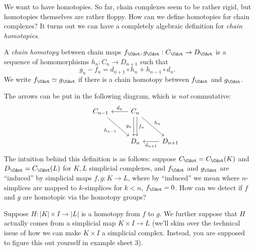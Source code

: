 \documentclass[a4paper]{article}
\begin{document}
We want to have homotopies. So far, chain complexes seem to be rather rigid, but homotopies themselves are rather floppy. How can we define homotopies for chain complexes? It turns out we can have a completely algebraic definition for \emph{chain homotopies}.

\begin{defi}
  A \emph{chain homotopy} between chain maps $f_{\Cdot}, g_{\Cdot}: C_{\Cdot} \to D_{\Cdot}$ is a sequence of homomorphisms $h_n: C_n \to D_{n + 1}$ such that
  \[
    g_n - f_n = d_{n + 1} \circ h_n + h_{n - 1} \circ d_n.
  \]
  We write $f_{\Cdot} \simeq g_{\Cdot}$ if there is a chain homotopy between $f_{\Cdot}$ and $g_{\Cdot}$.
\end{defi}
The arrows can be put in the following diagram, which is \emph{not} commutative:
\[
  \begin{tikzcd}[row sep=large]
    & C_{n - 1} \ar[rd, "h_{n - 1}"'] & C_n \ar [l, "d_n"'] \ar[d, shift left, "f_n"] \ar[d, shift right, "g_n"'] \ar [rd, "h_n"]\\
    & & D_n & D_{n + 1} \ar [l, "d_{n + 1}"]
  \end{tikzcd}
\]
The intuition behind this definition is as follows: suppose $C_{\Cdot} = C_{\Cdot} (K)$ and $D_{\Cdot} = C_{\Cdot}(L)$ for $K, L$ simplicial complexes, and $f_{\Cdot}$ and $g_{\Cdot}$ are ``induced'' by simplicial maps $f, g: K \to L$, where by ``induced'' we mean where $n$-simplices are mapped to $k$-simplices for $k<n$, $f_{\Cdot}=0$. How can we detect if $f$ and $g$ are homotopic via the homotopy groups?

Suppose $H: |K| \times I \to |L|$ is a homotopy from $f$ to $g$. We further suppose that $H$ actually comes from a simplicial map $K \times I \to L$ (we'll skim over the technical issue of how we can make $K \times I$ a simplicial complex. Instead, you are supposed to figure this out yourself in example sheet 3).
\end{document}
